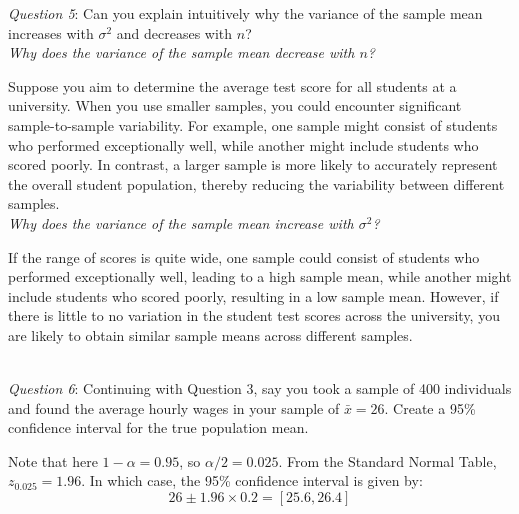 \documentclass{./../../Latex/handout}
\begin{document}
\newpage
\textit{Question 5}: Can you explain intuitively why the variance of the sample mean increases with $\sigma^2$ and decreases with $n$? \\

\textit{Why does the variance of the sample mean decrease with $n$?} 

Suppose you aim to determine the average test score for all students at a university. When you use smaller samples, you could encounter significant sample-to-sample variability. For example, one sample might consist of students who performed exceptionally well, while another might include students who scored poorly. In contrast, a larger sample is more likely to accurately represent the overall student population, thereby reducing the variability between different samples. \\

\textit{Why does the variance of the sample mean increase with $\sigma^2$?}

If the range of scores is quite wide, one sample could consist of students who performed exceptionally well, leading to a high sample mean, while another might include students who scored poorly, resulting in a low sample mean. However, if there is little to no variation in the student test scores across the university, you are likely to obtain similar sample means across different samples.

\newpage
{} \\

\textit{Question 6}: Continuing with Question 3, say you took a sample of 400 individuals and found the average hourly wages in your sample of $\bar{x} = 26$. Create a 95\% confidence interval for the true population mean. 

Note that here $1-\alpha = 0.95$, so $\alpha/2=0.025$. From the Standard Normal Table, $z_{0.025}=1.96$. In which case, the 95\% confidence interval is given by:
$$ 26 \pm 1.96 \times 0.2 = [25.6, 26.4] $$

 
\end{document}
